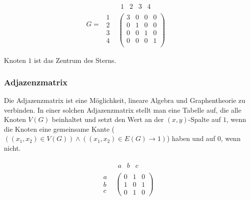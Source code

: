 \documentclass{scrartcl}
\begin{document}
\begin{equation}
	G = \begin{array}{r|c}
	& \begin{matrix} 1 & 2 & 3 & 4 \end{matrix} \\
	  \hline
	  \begin{matrix}
			1\\
			2\\
			3\\
			4\\
		\end{matrix} &
		\begin{pmatrix*}
			3 & 0 & 0 & 0\\
			0 & 1 & 0 & 0\\
			0 & 0 & 1 & 0\\
			0 & 0 & 0 & 1\\
		\end{pmatrix*}
	\end{array}
\end{equation}

Knoten $1$ ist das Zentrum des Sterns.


\subsubsection{Adjazenzmatrix}

\label{adjazenzmatrix}

Die Adjazenzmatrix ist eine Möglichkeit, lineare Algebra und Graphentheorie zu verbinden. In einer solchen Adjazenzmatrix 
stellt man eine Tabelle auf, die alle Knoten $V(G)$ beinhaltet und setzt den Wert an der $(x, y)$-Spalte auf $1$, wenn die
Knoten eine gemeinsame Kante ($\left(\left(x_1, x_2\right) \in V(G)\right) \wedge \left(\left(x_1, x_2\right) \in E(G) \longrightarrow 1\right)$) haben und auf $0$, wenn nicht.

\begin{equation}
	\begin{array}{r|c}
	  & \begin{matrix} a & b & c \end{matrix} \\
	  \hline
	  \begin{matrix}
			a\\
			b\\
			c
		\end{matrix} &
		\begin{pmatrix*}
			0 & 1 & 0\\
			1 & 0 & 1\\
			0 & 1 & 0
		\end{pmatrix*}
	\end{array}
\end{equation}
\end{document}
